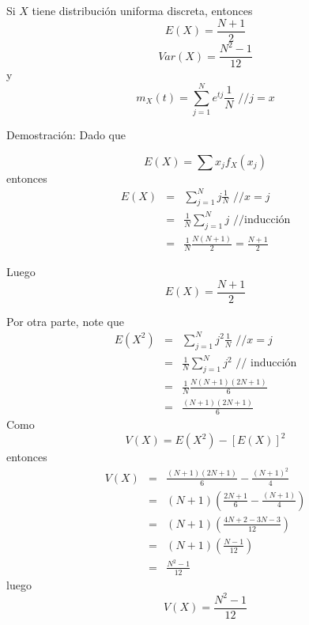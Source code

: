 \begin{i}

\begin{theorem}
Si $X$ tiene distribución uniforma discreta, entonces
\begin{equation*}
E(X)=\frac{N+1}{2}
\end{equation*}
\begin{equation*}
Var(X)=\frac{N^{2}-1}{12}
\end{equation*}
y 
\begin{equation*}
m_{X}(t)=\sum\limits_{j=1}^{N}e^{tj}\frac{1}{N}\text{ //}j=x
\end{equation*}
\end{theorem}

Demostración: Dado que

\begin{equation*}
E(X)=\sum x_{j}f_{X}(x_{j})
\end{equation*}%
entonces%
\begin{eqnarray*}
E(X) &=&\sum_{j=1}^{N}j\frac{1}{N}\text{ \ \ //}x=j \\
&=&\frac{1}{N}\sum_{j=1}^{N}j\text{ \ \ //inducción} \\
&=&\frac{1}{N}\frac{N(N+1)}{2}=\frac{N+1}{2}
\end{eqnarray*}

Luego 
\begin{equation*}
E(X)=\frac{N+1}{2}
\end{equation*}

Por otra parte, note que 
\begin{eqnarray*}
E(X^{2}) &=&\sum_{j=1}^{N}j^{2}\frac{1}{N}\text{ \ //}x=j \\
&=&\frac{1}{N}\sum_{j=1}^{N}j^{2}\text{ // inducción} \\
&=&\frac{1}{N}\frac{N(N+1)(2N+1)}{6} \\
&=&\frac{(N+1)(2N+1)}{6}
\end{eqnarray*}
Como 
\begin{equation*}
V(X)=E(X^{2})-[E(X)]^{2}
\end{equation*}
entonces
\begin{eqnarray*}
V(X) &=&\frac{(N+1)(2N+1)}{6}-\frac{\left( N+1\right) ^{2}}{4} \\
&=&(N+1)\left( \frac{2N+1}{6}-\frac{\left( N+1\right) }{4}\right) \\
&=&(N+1)\left( \frac{4N+2-3N-3}{12}\right) \\
&=&(N+1)\left( \frac{N-1}{12}\right) \\
&=&\frac{N^{2}-1}{12}
\end{eqnarray*}
luego
\begin{equation*}
V(X)=\frac{N^{2}-1}{12}
\end{equation*}


\end{i}
